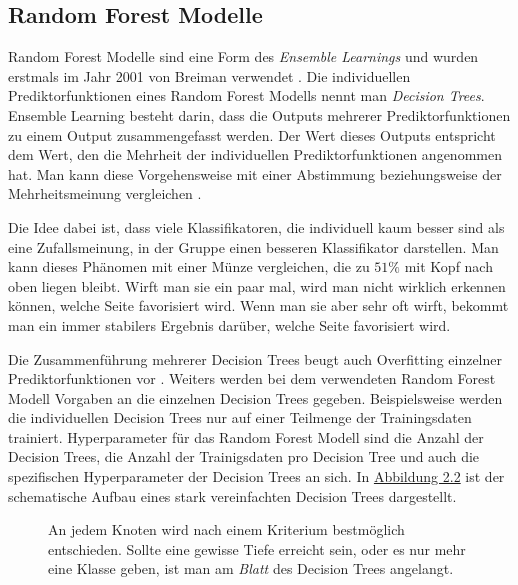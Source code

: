\subsection{Random Forest Modelle}
Random Forest Modelle sind eine Form des \textit{Ensemble Learnings} und wurden erstmals im Jahr 2001 von Breiman verwendet \cite{breiman2001random}.
Die individuellen Prediktorfunktionen eines Random
Forest Modells nennt man \textit{Decision Trees}.
Ensemble Learning besteht darin, dass die Outputs mehrerer Prediktorfunktionen zu einem Output zusammengefasst werden. Der Wert dieses Outputs entspricht
dem Wert, den die Mehrheit der individuellen Prediktorfunktionen angenommen hat.
Man kann diese Vorgehensweise mit einer Abstimmung beziehungsweise der Mehrheitsmeinung vergleichen \cite[Seiten 189 bis 191]{handson}.

Die Idee dabei ist, dass viele Klassifikatoren, die individuell kaum besser sind als eine Zufallsmeinung, in der Gruppe einen
besseren Klassifikator darstellen. Man kann dieses Ph\"anomen mit einer M\"unze vergleichen, die zu $51\%$ mit Kopf nach oben liegen bleibt. Wirft
man sie ein paar mal, wird man nicht wirklich erkennen k\"onnen, welche Seite favorisiert wird. Wenn man sie aber sehr oft wirft, bekommt man
ein immer stabilers Ergebnis dar\"uber, welche Seite favorisiert wird.

Die Zusammenf\"uhrung mehrerer Decision Trees beugt auch Overfitting einzelner Prediktorfunktionen vor \cite[Seiten 255 und 256]{shalev}. Weiters
werden bei dem verwendeten Random Forest Modell Vorgaben an die einzelnen
Decision Trees gegeben. Beispielsweise werden die individuellen Decision Trees nur auf einer Teilmenge der Trainingsdaten trainiert. Hyperparameter f\"ur das Random Forest Modell sind
die Anzahl der Decision Trees, die Anzahl der Trainigsdaten pro Decision Tree und auch die spezifischen Hyperparameter der Decision Trees an sich. In \hyperref[fig:rf1]{Abbildung 2.2} ist der schematische Aufbau
eines stark vereinfachten Decision Trees dargestellt.

\begin{figure}[ht]
	\label{fig:rf1}
	\begin{center}
		\begin{tiny}
		\end{tiny}
	\end{center}
	\caption[Schematische Darstellung eines Decision Tree Modells]
	{An jedem Knoten wird nach einem Kriterium bestm\"oglich entschieden. Sollte eine gewisse Tiefe erreicht sein,
		oder es nur mehr eine Klasse geben, ist man am \textit{Blatt} des Decision Trees angelangt.}
\end{figure}



